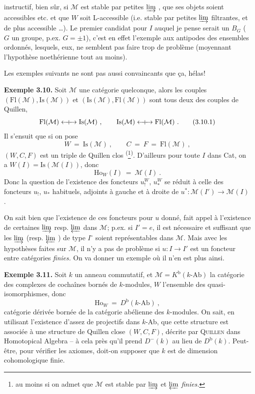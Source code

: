 \documentclass[11pt]{article}
\newcommand{\printedpage}[1]{\marginpar{\footnotesize p.~#1}}
\newcommand{\msp}[1]{\marginpar{\footnotesize [#1]}}
\newcommand{\limind}{\varinjlim}
\newcommand{\limproj}{\varprojlim}
\newcommand{\Fl}{\mathrm{Fl}}
\newcommand{\Is}{\mathrm{Is}}
\newcommand{\Ho}{\mathrm{Ho}}
\newcommand{\Qcouple}{\mathrel{\leftarrow\mkern-9mu{+}\mkern-9mu\rightarrow}}
\begin{document}
\printedpage{24}
\msp{page 43}
instructif, bien sûr, si $\mathcal{M}$ est stable par petites $\limind$ , que ses objets soient accessibles etc. et que $W$ soit L-accessible (i.e. stable par petites $\limind$ filtrantes, et de plus accessible \dots). Le premier candidat pour $I$ auquel je pense serait un $B_G$ ($G$ un groupe, p.ex. $G=\pm1$), c'est en effet l'exemple aux antipodes des ensembles ordonnés, lesquels, eux, ne semblent pas faire trop de problème (moyennant l'hypothèse noethérienne tout au moins).

Les exemples suivants ne sont pas aussi convaincants que ça, hélas!

\textbf{Exemple 3.10.} Soit $\mathcal{M}$ une catégorie quelconque, alors les couples $(\Fl(\mathcal{M}),\Is(\mathcal{M}))$ et $(\Is(\mathcal{M}),\Fl(\mathcal{M}))$ sont tous deux des couples de Quillen,
\[
\Fl(\mathcal{M}) \Qcouple \Is(\mathcal{M}) \ , \qquad \Is(\mathcal{M}) \Qcouple \Fl(\mathcal{M}) \ . \tag*{(3.10.1)} %
\]
Il s'ensuit que si on pose
\[
W \ = \ \Is(\mathcal{M}) \ , \qquad C \ = \ F \ = \ \Fl(\mathcal{M}) \ , \tag*{(3.10.2)}
\]
$(W,C,F)$ est un triple de Quillen clos \textsuperscript{(}\footnote[22]{au moins si on admet que $\mathcal{M}$ est stable par $\limind$ et $\limproj$ \textit{finies.}}\textsuperscript{)}. D'ailleurs pour toute $I$ dans Cat, on a $W(I)=\Is(\mathcal{M}(I))$, donc
\[
\Ho_W(I) \ = \ \mathcal{M}(I) \ . \tag*{(3.10.3)}
\]
Donc la question de l'existence des foncteurs $u_!^W$, $u_*^W$ se réduit à celle des foncteurs $u_!$, $u_*$ habituels, adjoints à gauche et à droite de $u^* : \mathcal{M}(I') \longrightarrow \mathcal{M}(I)$.

\msp{page 44}
On sait bien que l'existence de ces foncteurs pour $u$ donné, fait appel à l'existence de certaines $\limind$ resp. $\limproj$ dans $\mathcal{M}$; p.ex. si $I'=e$, il est nécessaire et suffisant que les $\limind$ (resp. $\limproj$ ) de type $I^\circ$ soient représentables dans $\mathcal{M}$. Mais avec les hypothèses faites sur $\mathcal{M}$, il n'y a pas de problème si $u : I \longrightarrow I'$ est un foncteur entre catégories \textit{finies.} On va donner un exemple où il n'en est plus ainsi.

\textbf{Exemple 3.11.} Soit $k$ un anneau commutatif, et $\mathcal{M}=K^{\mathrm{b}}(k\text{-Ab})$ la catégorie des complexes de cochaînes bornés de $k$-modules, $W$ l'ensemble des quasi-isomorphismes, donc
\[
\Ho_W \ = \ D^{\mathrm{b}}(k\text{-Ab}) \ ,
\]
catégorie dérivée bornée de la catégorie abélienne des $k$-modules. On sait, en utilisant l'existence d'assez de projectifs dans $k$-Ab, que cette structure est associée à une structure de Quillen close $(W,C,F)$, décrite par \textsc{Quillen}
\msp{page 45}
dans Homotopical Algebra -- à cela près qu'il prend $D^-(k)$ au lieu de $D^{\mathrm{b}}(k)$. Peut-être, pour vérifier les axiomes, doit-on supposer que $k$ est de dimension cohomologique finie.
\end{document}
